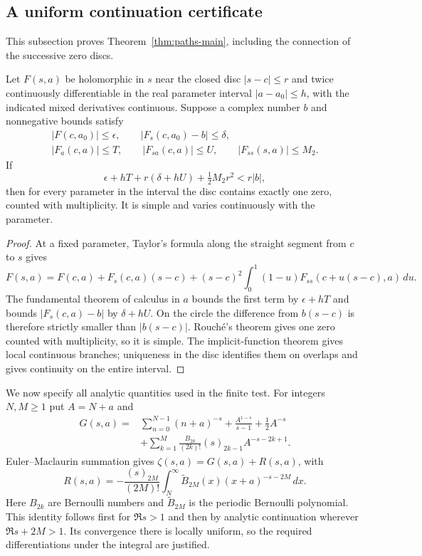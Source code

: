 \subsection{A uniform continuation certificate}
This subsection proves Theorem~\ref{thm:paths-main}, including the connection of the successive zero discs.

\begin{lemma}\label{lem:rouche}
Let $F(s,a)$ be holomorphic in $s$ near the closed disc $|s-c|\le r$ and twice continuously differentiable in the real parameter interval $|a-a_0|\le h$, with the indicated mixed derivatives continuous. Suppose a complex number $b$ and nonnegative bounds satisfy
\[
\begin{gathered}
 |F(c,a_0)|\le\epsilon,\qquad |F_s(c,a_0)-b|\le\delta,\\
 |F_a(c,a)|\le T,\qquad |F_{sa}(c,a)|\le U,\qquad
 |F_{ss}(s,a)|\le M_2.
\end{gathered}
\]
If
\begin{equation}\label{eq:rouche}
 \epsilon+hT+r(\delta+hU)+\tfrac12M_2r^2<r|b|,
\end{equation}
then for every parameter in the interval the disc contains exactly one zero, counted with multiplicity. It is simple and varies continuously with the parameter.
\end{lemma}
\begin{proof}
At a fixed parameter, Taylor's formula along the straight segment from $c$ to $s$ gives
\[
 F(s,a)=F(c,a)+F_s(c,a)(s-c)
 +(s-c)^2\int_0^1(1-u)F_{ss}(c+u(s-c),a)\,du.
\]
The fundamental theorem of calculus in $a$ bounds the first term by $\epsilon+hT$ and bounds $|F_s(c,a)-b|$ by $\delta+hU$. On the circle the difference from $b(s-c)$ is therefore strictly smaller than $|b(s-c)|$. Rouch\'e's theorem gives one zero counted with multiplicity, so it is simple. The implicit-function theorem gives local continuous branches; uniqueness in the disc identifies them on overlaps and gives continuity on the entire interval.
\end{proof}

We now specify all analytic quantities used in the finite test. For integers $N,M\ge1$ put $A=N+a$ and
\begin{align*}
 G(s,a)={}&\sum_{n=0}^{N-1}(n+a)^{-s}
 +\frac{A^{1-s}}{s-1}+\frac12A^{-s}\\
 &+\sum_{k=1}^{M}\frac{B_{2k}}{(2k)!}
       (s)_{2k-1}A^{-s-2k+1}.
\end{align*}
Euler--Maclaurin summation gives $\zeta(s,a)=G(s,a)+R(s,a)$, with
\[
 R(s,a)=-\frac{(s)_{2M}}{(2M)!}
   \int_N^\infty \widetilde B_{2M}(x)(x+a)^{-s-2M}\,dx.
\]
Here $B_{2k}$ are Bernoulli numbers and $\widetilde B_{2M}$ is the periodic Bernoulli polynomial. This identity follows first for $\Re s>1$ and then by analytic continuation wherever $\Re s+2M>1$. Its convergence there is locally uniform, so the required differentiations under the integral are justified.

